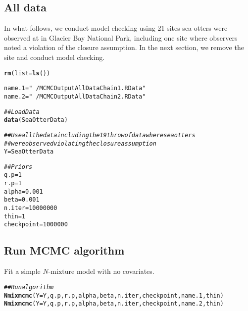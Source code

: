 \documentclass[12pt,letterpaper,final]{article}\usepackage[]{graphicx}\usepackage[]{color}
\makeatletter
\newcommand{\hlnum}[1]{\textcolor[rgb]{0.686,0.059,0.569}{#1}}%
\newcommand{\hlstr}[1]{\textcolor[rgb]{0.192,0.494,0.8}{#1}}%
\newcommand{\hlcom}[1]{\textcolor[rgb]{0.678,0.584,0.686}{\textit{#1}}}%
\newcommand{\hlstd}[1]{\textcolor[rgb]{0.345,0.345,0.345}{#1}}%
\newcommand{\hlkwb}[1]{\textcolor[rgb]{0.69,0.353,0.396}{#1}}%
\newcommand{\hlkwc}[1]{\textcolor[rgb]{0.333,0.667,0.333}{#1}}%
\newcommand{\hlkwd}[1]{\textcolor[rgb]{0.737,0.353,0.396}{\textbf{#1}}}%
\newenvironment{kframe}{%
 \def\at@end@of@kframe{}%
 \ifinner\ifhmode%
  \def\at@end@of@kframe{\end{minipage}}%
  \begin{minipage}{\columnwidth}%
 \fi\fi%
 \def\FrameCommand##1{\hskip\@totalleftmargin \hskip-\fboxsep
 \colorbox{shadecolor}{##1}\hskip-\fboxsep
     \hskip-\linewidth \hskip-\@totalleftmargin \hskip\columnwidth}%
 \MakeFramed {\advance\hsize-\width
   \@totalleftmargin\z@ \linewidth\hsize
   \@setminipage}}%
 {\par\unskip\endMakeFramed%
 \at@end@of@kframe}
\newenvironment{knitrout}{}{} %
\makeatother
\begin{document}
\subsection{All data}
In what follows, we conduct model checking using 21 sites sea otters
were observed at in Glacier Bay National Park, including one site
where observers noted a violation of the closure assumption. In the
next section, we remove the site and conduct model checking.
\begin{knitrout}
\color{fgcolor}\begin{kframe}
\begin{alltt}
\hlkwd{rm}\hlstd{(}\hlkwc{list}\hlstd{=}\hlkwd{ls}\hlstd{())}

\hlstd{name.1}\hlkwb{=}\hlstr{"~/MCMCOutputAllDataChain1.RData"}
\hlstd{name.2}\hlkwb{=}\hlstr{"~/MCMCOutputAllDataChain2.RData"}

\hlcom{## Load Data}
\hlkwd{data}\hlstd{(SeaOtterData)}

\hlcom{## Use all the data including the 19th row of data where sea otters}
\hlcom{## were observed violating the closure assumption}
\hlstd{Y}\hlkwb{=}\hlstd{SeaOtterData}

\hlcom{## Priors}
\hlstd{q.p}\hlkwb{=}\hlnum{1}
\hlstd{r.p}\hlkwb{=}\hlnum{1}
\hlstd{alpha}\hlkwb{=}\hlnum{0.001}
\hlstd{beta}\hlkwb{=}\hlnum{0.001}
\hlstd{n.iter}\hlkwb{=}\hlnum{10000000}
\hlstd{thin}\hlkwb{=}\hlnum{1}
\hlstd{checkpoint}\hlkwb{=}\hlnum{1000000}
\end{alltt}
\end{kframe}
\end{knitrout}

\subsection{Run MCMC algorithm}
Fit a simple $N$-mixture model with no covariates.

\begin{knitrout}
\color{fgcolor}\begin{kframe}
\begin{alltt}
\hlcom{## Run algorithm}
\hlkwd{Nmixmcmc}\hlstd{(}\hlkwc{Y}\hlstd{=Y,q.p,r.p,alpha,beta,n.iter,checkpoint,name.1,thin)}
\hlkwd{Nmixmcmc}\hlstd{(}\hlkwc{Y}\hlstd{=Y,q.p,r.p,alpha,beta,n.iter,checkpoint,name.2,thin)}
\end{alltt}
\end{kframe}
\end{knitrout}
\end{document}
